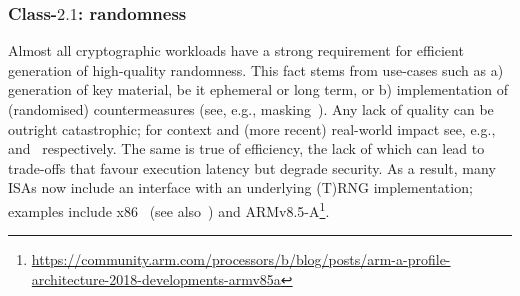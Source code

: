 \subsubsection{Class-$2.1$: randomness}
\label{sec:spec:instruction:2:1}

Almost all cryptographic workloads have a strong requirement for efficient
generation of high-quality randomness.  This fact stems from use-cases such
as
a) generation of key material, be it ephemeral or long term,
   or
b) implementation of (randomised) countermeasures
   (see, e.g., masking~\cite[Chapter 9]{SCARV:ManOswPop:07}).
Any lack of quality can be outright catastrophic;
for context and (more recent) real-world impact see, e.g.,~\cite{SCARV:KSWH:98,SCARV:RFC:4086} and~\cite{SCARV:NSSKM:17} respectively.
The same is true of efficiency, the lack of which can lead to trade-offs 
that favour execution latency but degrade security.
As a result, many ISAs now include an interface with an underlying (T)RNG
implementation; examples include
x86~\cite[Section 7.3.17.1 and 7.3.17.2]{SCARV:X86:2:18} (see also~\cite{SCARV:JunKoc:99,SCARV:HamKocMar:12})
and
ARMv8.5-A\footnote{
\url{https://community.arm.com/processors/b/blog/posts/arm-a-profile-architecture-2018-developments-armv85a}
}.





